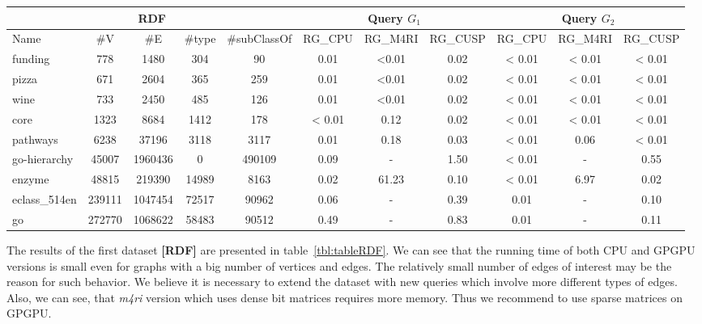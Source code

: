 {\setlength{\tabcolsep}{0.4em}
\begin{table*}[h]
\caption{RDFs querying results}
\label{tbl:tableRDF}
\begin{tabular}{| p{1.5cm} | c | c |c | c | c | c | c | c | c | c |}
    \hline
    \multicolumn{5}{|c|}{RDF}        & \multicolumn{3}{|c|}{Query $G_1$}                               & \multicolumn{3}{|c|}{Query $G_2$} \\
    \hline
    Name                  & \#V    & \#E     & \#type &\#subClassOf & RG\_CPU & RG\_M4RI  & RG\_CUSP   & RG\_CPU & RG\_M4RI  & RG\_CUSP \\
    \hline
    \hline
    \small{funding}       & 778    & 1480    & 304   & 90           & 0.01      & <0.01   & 0.02       & < 0.01  & < 0.01    & < 0.01    \\
    \small{pizza}         & 671    & 2604    & 365   & 259          & 0.01      & <0.01   & 0.02       & < 0.01  & < 0.01    & < 0.01    \\
    \small{wine}          & 733    & 2450    & 485   & 126          & 0.01      & <0.01   & 0.02       & < 0.01  & < 0.01    & < 0.01    \\
    \small{core}          & 1323   & 8684    & 1412  & 178          & < 0.01    & 0.12    & 0.02       & < 0.01  & < 0.01    & < 0.01    \\
    \small{pathways}      & 6238   & 37196   & 3118  & 3117         & 0.01      & 0.18    & 0.03       & < 0.01  & 0.06      & < 0.01    \\
    \small{go-hierarchy}  & 45007  & 1960436 & 0     & 490109       & 0.09      & -       & 1.50       & < 0.01  & -         & 0.55      \\
    \small{enzyme}        & 48815  & 219390  & 14989 & 8163         & 0.02      & 61.23   & 0.10       & < 0.01  & 6.97      & 0.02      \\
    \small{eclass\_514en} & 239111 & 1047454 & 72517 & 90962        & 0.06      & -       & 0.39       & 0.01    & -         & 0.10      \\
    \small{go}            & 272770 & 1068622 & 58483 & 90512        & 0.49      & -       & 0.83       & 0.01    & -         & 0.11      \\
    \hline
  \end{tabular}
\end{table*}
}


The results of the first dataset \textbf{[RDF]} are presented in table~\ref{tbl:tableRDF}.
We can see that the running time of both CPU and GPGPU versions is small even for graphs with a big number of vertices and edges.
The relatively small number of edges of interest may be the reason for such behavior.
We believe it is necessary to extend the dataset with new queries which involve more different types of edges.
Also, we can see, that \textit{m4ri} version which uses dense bit matrices requires more memory.
Thus we recommend to use sparse matrices on GPGPU.

